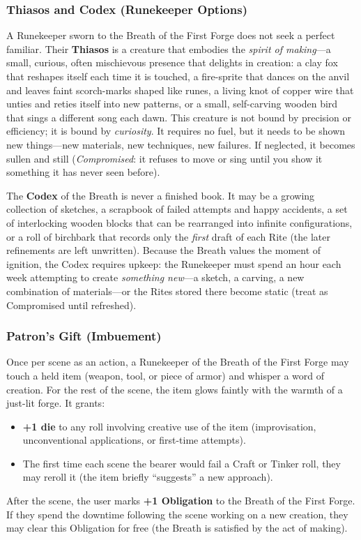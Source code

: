 \subsubsection*{Thiasos and Codex (Runekeeper Options)}
A Runekeeper sworn to the Breath of the First Forge does not seek a perfect familiar. Their \textbf{Thiasos} is a creature that embodies the \emph{spirit of making}---a small, curious, often mischievous presence that delights in creation: a clay fox that reshapes itself each time it is touched, a fire-sprite that dances on the anvil and leaves faint scorch-marks shaped like runes, a living knot of copper wire that unties and reties itself into new patterns, or a small, self-carving wooden bird that sings a different song each dawn. This creature is not bound by precision or efficiency; it is bound by \emph{curiosity}. It requires no fuel, but it needs to be shown new things---new materials, new techniques, new failures. If neglected, it becomes sullen and still (\emph{Compromised}: it refuses to move or sing until you show it something it has never seen before).

The \textbf{Codex} of the Breath is never a finished book. It may be a growing collection of sketches, a scrapbook of failed attempts and happy accidents, a set of interlocking wooden blocks that can be rearranged into infinite configurations, or a roll of birchbark that records only the \emph{first} draft of each Rite (the later refinements are left unwritten). Because the Breath values the moment of ignition, the Codex requires upkeep: the Runekeeper must spend an hour each week attempting to create \emph{something new}---a sketch, a carving, a new combination of materials---or the Rites stored there become static (treat as Compromised until refreshed).

\subsubsection*{Patron's Gift (Imbuement)}
Once per scene as an action, a Runekeeper of the Breath of the First Forge may touch a held item (weapon, tool, or piece of armor) and whisper a word of creation. For the rest of the scene, the item glows faintly with the warmth of a just-lit forge. It grants:
\begin{itemize}
  \item \textbf{+1 die} to any roll involving creative use of the item (improvisation, unconventional applications, or first-time attempts).
  \item The first time each scene the bearer would fail a Craft or Tinker roll, they may reroll it (the item briefly ``suggests'' a new approach).
\end{itemize}
After the scene, the user marks \textbf{+1 Obligation} to the Breath of the First Forge. If they spend the downtime following the scene working on a new creation, they may clear this Obligation for free (the Breath is satisfied by the act of making).

